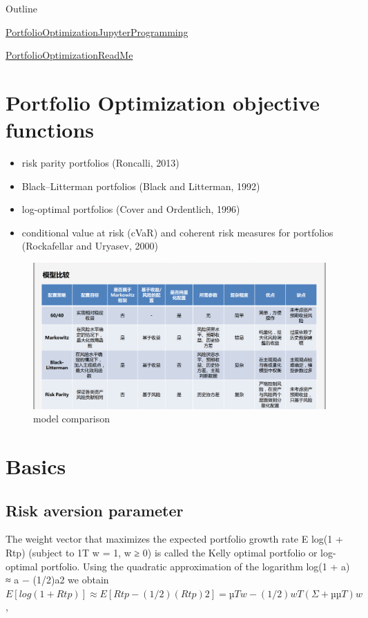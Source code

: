 \documentclass[presentation]{beamer}
\author{weiwu}
\date{\textit{<2017-07-05 Wed>}}
\title{}
\begin{document}
\begin{frame}{Outline}
\tableofcontents
\end{frame}

\href{../CS/Python/py4fi/Optimization.html}{PortfolioOptimizationJupyterProgramming}

\href{../CS/Python/py4fi/PortfolioOptimization.html}{PortfolioOptimizationReadMe}

\section{Portfolio Optimization objective functions}
\label{sec:orgheadline1}
\begin{itemize}
\item risk parity portfolios (Roncalli, 2013)
\item Black–Litterman portfolios (Black and Litterman, 1992)
\item log-optimal portfolios (Cover and Ordentlich, 1996)
\item conditional value at risk (cVaR) and coherent risk measures for portfolios (Rockafellar and Uryasev, 2000)
\end{itemize}
\begin{figure}[htb]
\centering
\includegraphics[width=.9\linewidth]{./images/model_comparison.png}
\caption{model comparison}
\end{figure}

\section{Basics}
\label{sec:orgheadline1}
\subsection{Risk aversion parameter}
\label{sec:orgheadline1}
The weight vector that maximizes the expected portfolio growth rate E log(1 + Rtp) (subject to 1T w = 1, w ≥ 0) is called the Kelly optimal portfolio or log-optimal portfolio. Using the quadratic approximation of the logarithm log(1 + a) ≈ a − (1/2)a2 we obtain
\(E[log(1 + Rtp)] ≈ E[Rtp − (1/2)(Rtp)2]
= µT w − (1/2)wT (Σ + µµT )w\),
\end{document}
